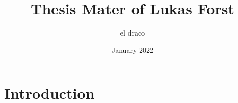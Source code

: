 \documentclass{article}
\title{Thesis Mater of Lukas Forst}
\author{el draco}
\date{January 2022}
\begin{document}
\maketitle

\section{Introduction}
\end{document}
